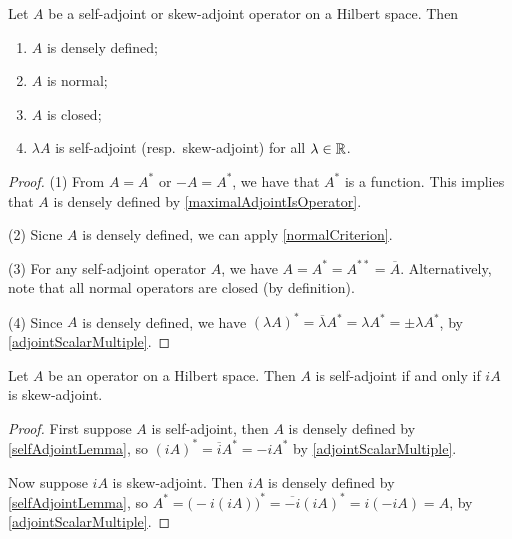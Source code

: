 \begin{lemma} \label{selfAdjointLemma}
Let $A$ be a self-adjoint or skew-adjoint operator on a Hilbert space. Then
\begin{enumerate}
\item $A$ is densely defined;
\item $A$ is normal;
\item $A$ is closed;
\item $\lambda A$ is self-adjoint (resp.\ skew-adjoint) for all $\lambda\in \mathbb{R}$.
\end{enumerate}
\end{lemma}
\begin{proof}
(1) From $A = A^*$ or $-A = A^*$, we have that $A^*$ is a function. This implies that $A$ is densely defined by \ref{maximalAdjointIsOperator}.

(2) Sicne $A$ is densely defined, we can apply \ref{normalCriterion}.

(3) For any self-adjoint operator $A$, we have $A = A^* = A^{**} = \overline{A}$. Alternatively, note that all normal operators are closed (by definition).

(4) Since $A$ is densely defined, we have $(\lambda A)^* = \overline{\lambda}A^* = \lambda A^* = \pm\lambda A^*$, by \ref{adjointScalarMultiple}.
\end{proof}

\begin{lemma}
Let $A$ be an operator on a Hilbert space. Then $A$ is self-adjoint \textup{if and only if} $iA$ is skew-adjoint.
\end{lemma}
\begin{proof}
First suppose $A$ is self-adjoint, then $A$ is densely defined by \ref{selfAdjointLemma}, so $(iA)^* = \overline{i}A^* = -iA^*$ by \ref{adjointScalarMultiple}.

Now suppose $iA$ is skew-adjoint. Then $iA$ is densely defined by \ref{selfAdjointLemma}, so $A^* = \big(-i(iA)\big)^* = \overline{-i}(iA)^* = i(-iA) = A$, by \ref{adjointScalarMultiple}.
\end{proof}

